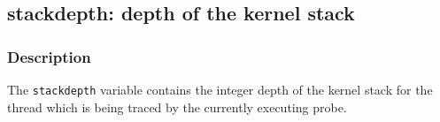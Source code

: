 \clearpage
{}
{}
\label{vars:stackdepth}
\subsection*{stackdepth: depth of the kernel stack}

\subsubsection*{Description}

The \verb|stackdepth| variable contains the integer depth of the
kernel stack for the thread which is being traced by the currently
executing probe.

